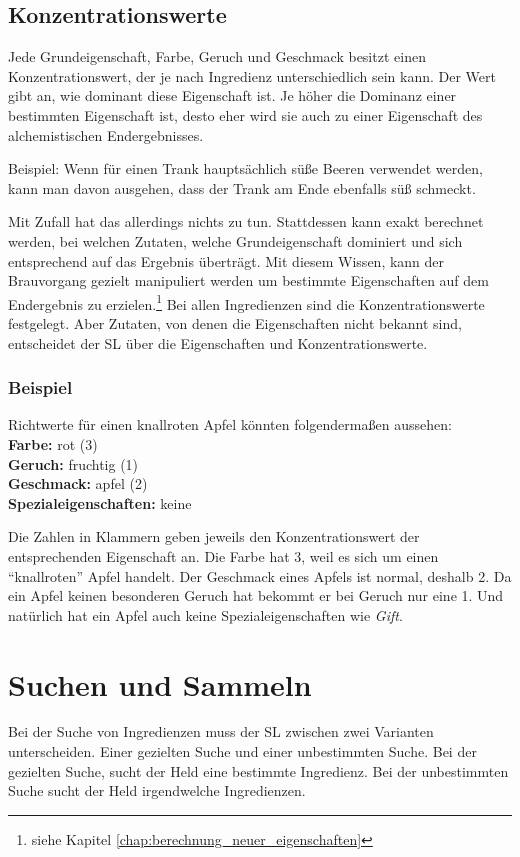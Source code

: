 \subsection{Konzentrationswerte}
Jede Grundeigenschaft, Farbe, Geruch und Geschmack besitzt einen Konzentrationswert, der je nach Ingredienz unterschiedlich sein kann. Der Wert gibt an, wie dominant diese Eigenschaft ist. Je höher die Dominanz einer bestimmten Eigenschaft ist, desto eher wird sie auch zu einer Eigenschaft des alchemistischen Endergebnisses. 

Beispiel: Wenn für einen Trank hauptsächlich süße Beeren verwendet werden, kann man davon ausgehen, dass der Trank am Ende ebenfalls süß schmeckt. 

Mit Zufall hat das allerdings nichts zu tun. Stattdessen kann exakt berechnet werden, bei welchen Zutaten, welche Grundeigenschaft dominiert und sich entsprechend auf das Ergebnis überträgt. Mit diesem Wissen, kann der Brauvorgang gezielt manipuliert werden um bestimmte Eigenschaften auf dem Endergebnis zu erzielen.\footnote{siehe Kapitel \ref{chap:berechnung_neuer_eigenschaften}} Bei allen Ingredienzen sind die Konzentrationswerte festgelegt. Aber Zutaten, von denen die Eigenschaften nicht bekannt sind, entscheidet der SL über die Eigenschaften und Konzentrationswerte.

\subsubsection{Beispiel} 
Richtwerte für einen knallroten Apfel könnten folgendermaßen aussehen:\\
\textbf{Farbe:} rot (3) \\
\textbf{Geruch:} fruchtig (1) \\
\textbf{Geschmack:} apfel (2)  \\
\textbf{Spezialeigenschaften:} keine

Die Zahlen in Klammern geben jeweils den Konzentrationswert der entsprechenden Eigenschaft an. Die Farbe hat 3, weil es sich um einen "`knallroten"' Apfel handelt. Der Geschmack eines Apfels ist normal, deshalb 2. Da ein Apfel keinen besonderen Geruch hat bekommt er bei Geruch nur eine 1. Und natürlich hat ein Apfel auch keine Spezialeigenschaften wie \textit{Gift}. 


\section{Suchen und Sammeln}
Bei der Suche von Ingredienzen muss der SL zwischen zwei Varianten unterscheiden. Einer gezielten Suche und einer unbestimmten Suche. Bei der gezielten Suche, sucht der Held eine bestimmte Ingredienz. Bei der unbestimmten Suche sucht der Held irgendwelche Ingredienzen.

